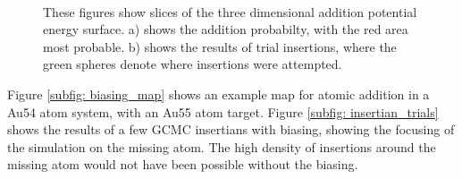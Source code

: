 \begin{figure}
    \centering
     \\
	\caption[Addition biasing with a Lennard Jones potential.]{These figures show slices of the three dimensional addition potential energy surface. a) shows the addition probabilty, with the red area most probable. b) shows the results of trial insertions, where the green spheres denote where insertions were attempted.}
	\label{fig:biasing}
\end{figure}
Figure \ref{subfig: biasing_map} shows an example map for atomic addition in a Au54 atom system, with an Au55 atom target.
Figure \ref{subfig: insertian_trials} shows the results of a few GCMC insertians with biasing, showing the focusing of the simulation on the missing atom.
The high density of insertions around the missing atom would not have been possible without the biasing.